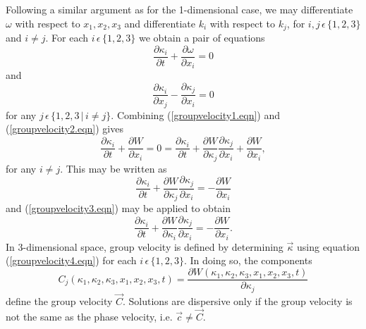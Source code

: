 \documentclass[12pt]{article}
\theoremstyle{definition}
\numberwithin{equation}{section}
\begin{document}
{Following a similar argument as for the 1-dimensional case, we may differentiate $\omega$ with respect to $x_1,x_2,x_3$ and differentiate $k_i$ with respect to $k_j$, for $i,j\,\epsilon\,\{ 1,2,3\}$ and $i\neq j$. For each $i\,\epsilon\,\{1,2,3\}$ we obtain a pair of equations
\begin{equation}
\frac{\partial\kappa_i}{\partial t}+\frac{\partial\omega}{\partial x_i}=0
\label{groupvelocity2.eqn}
\end{equation}
and
\begin{equation}
\frac{\partial\kappa_i}{\partial x_j}-\frac{\partial\kappa_j}{\partial x_i}=0
\label{groupvelocity3.eqn}
\end{equation}
for any $j\,\epsilon\,\{1,2,3\,\vert\, i\neq j\}$. Combining (\ref{groupvelocity1.eqn}) and (\ref{groupvelocity2.eqn}) gives
$$\frac{\partial\kappa_i}{\partial t} + \frac{\partial W}{\partial x_i}=0=\frac{\partial\kappa_i}{\partial t} + \frac{\partial W}{\partial\kappa_j}\frac{\partial\kappa_j}{\partial x_i}+\frac{\partial W}{\partial x_i},$$
for any $i\neq j$. This may be written as
$$\frac{\partial\kappa_i}{\partial t} + \frac{\partial W}{\partial\kappa_j}\frac{\partial\kappa_j}{\partial x_i}=-\frac{\partial W}{\partial x_i}$$
and (\ref{groupvelocity3.eqn}) may be applied to obtain
\begin{equation}
\frac{\partial\kappa_i}{\partial t} + \frac{\partial W}{\partial\kappa_i}\frac{\partial\kappa_j}{\partial x_i}=-\frac{\partial W}{\partial x_i}.
\label{groupvelocity4.eqn}
\end{equation}
In 3-dimensional space, group velocity is defined by determining $\vec{\kappa}$ using equation (\ref{groupvelocity4.eqn}) for each $i\,\epsilon\,\{1,2,3\}$. In doing so, the components
$$C_j(\kappa_1,\kappa_2,\kappa_3,x_1,x_2,x_3,t)=\frac{\partial W(\kappa_1,\kappa_2,\kappa_3,x_1,x_2,x_3,t)}{\partial\kappa_j}$$
define the group velocity $\vec{C}$. Solutions are dispersive only if the group velocity is not the same as the phase velocity, i.e. $\vec{c}\neq\vec{C}$.
}
\end{document}

